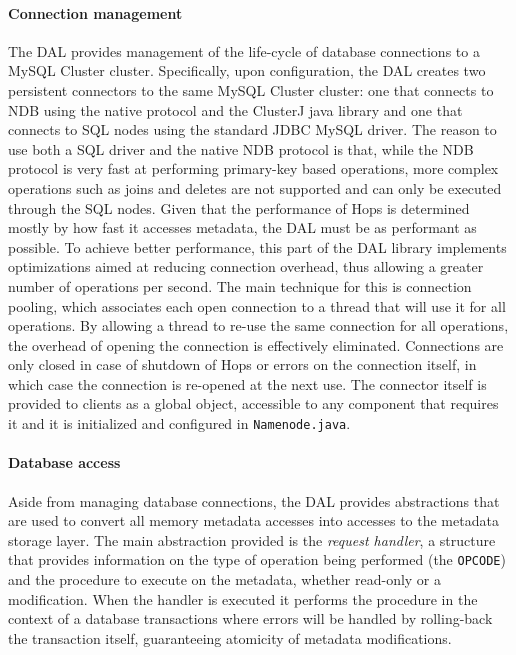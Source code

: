 \paragraph{Connection management}
The DAL provides management of the life-cycle of database connections to a MySQL Cluster cluster.
Specifically, upon configuration, the DAL creates two persistent connectors to the same MySQL Cluster cluster: one that connects to NDB using the native protocol and the ClusterJ java library and one that connects to SQL nodes using the standard JDBC MySQL driver.
The reason to use both a SQL driver and the native NDB protocol is that, while the NDB protocol is very fast at performing primary-key based operations, more complex operations such as joins and deletes are not supported and can only be executed through the SQL nodes.
Given that the performance of Hops is determined mostly by how fast it accesses metadata, the DAL must be as performant as possible.
To achieve better performance, this part of the DAL library implements optimizations aimed at reducing connection overhead, thus allowing a greater number of operations per second.
The main technique for this is connection pooling, which associates each open connection to a thread that will use it for all operations.
By allowing a thread to re-use the same connection for all operations, the overhead of opening the connection is effectively eliminated.
Connections are only closed in case of shutdown of Hops or errors on the connection itself, in which case the connection is re-opened at the next use. 
The connector itself is provided to clients as a global object, accessible to any component that requires it and it is initialized and configured in \texttt{Namenode.java}.

\paragraph{Database access}
Aside from managing database connections, the DAL provides abstractions that are used to convert all memory metadata accesses into accesses to the metadata storage layer.
The main abstraction provided is the \emph{request handler}, a structure that provides information on the type of operation being performed (the \texttt{OPCODE}) and the procedure to execute on the metadata, whether read-only or a modification.
When the handler is executed it performs the procedure in the context of a database transactions where errors will be handled by rolling-back the transaction itself, guaranteeing atomicity of metadata modifications.

